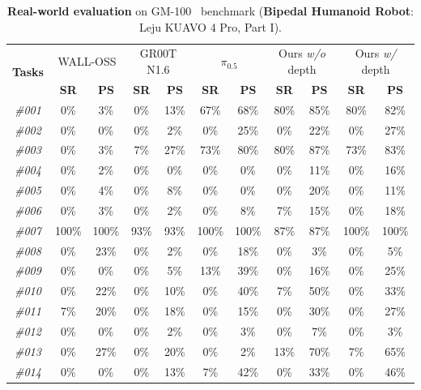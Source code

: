 \begin{table}[t]
  \centering
  \caption{\textbf{Real-world evaluation} on GM-100~\cite{gm100} benchmark (\textbf{Bipedal Humanoid Robot}: Leju KUAVO 4 Pro, Part I).}
  \small
  \setlength{\tabcolsep}{12pt}
    \begin{tabular}{ccccccccccc}
    \toprule
      \multirow{2}[2]{*}{\textbf{Tasks}} & \multicolumn{2}{c}{WALL-OSS} & \multicolumn{2}{c}{GR00T N1.6} &
  \multicolumn{2}{c}{$\pi_{0.5}$} & \multicolumn{2}{c}{Ours \textit{w/o} depth} & \multicolumn{2}{c}{Ours
  \textit{w/} depth} \\
            & \textbf{SR} & \textbf{PS} & \textbf{SR} & \textbf{PS} & \textbf{SR} & \textbf{PS} & \textbf{SR} &
  \textbf{PS} & \textbf{SR} & \textbf{PS} \\
    \midrule
      \textit{\#001} & 0\% & 3\% & 0\% & 13\% & 67\% & 68\% & 80\% & 85\% & 80\% & 82\% \\
      \textit{\#002} & 0\% & 0\% & 0\% & 2\% & 0\% & 25\% & 0\% & 22\% & 0\% & 27\% \\
      \textit{\#003} & 0\% & 3\% & 7\% & 27\% & 73\% & 80\% & 80\% & 87\% & 73\% & 83\% \\
      \textit{\#004} & 0\% & 2\% & 0\% & 0\% & 0\% & 0\% & 0\% & 11\% & 0\% & 16\% \\
      \textit{\#005} & 0\% & 4\% & 0\% & 8\% & 0\% & 0\% & 0\% & 20\% & 0\% & 11\% \\
      \textit{\#006} & 0\% & 3\% & 0\% & 2\% & 0\% & 8\% & 7\% & 15\% & 0\% & 18\% \\
      \textit{\#007} & 100\% & 100\% & 93\% & 93\% & 100\% & 100\% & 87\% & 87\% & 100\% & 100\% \\
      \textit{\#008} & 0\% & 23\% & 0\% & 2\% & 0\% & 18\% & 0\% & 3\% & 0\% & 5\% \\
      \textit{\#009} & 0\% & 0\% & 0\% & 5\% & 13\% & 39\% & 0\% & 16\% & 0\% & 25\% \\
      \textit{\#010} & 0\% & 22\% & 0\% & 10\% & 0\% & 40\% & 7\% & 50\% & 0\% & 33\% \\
      \textit{\#011} & 7\% & 20\% & 0\% & 18\% & 0\% & 15\% & 0\% & 30\% & 0\% & 27\% \\
      \textit{\#012} & 0\% & 0\% & 0\% & 2\% & 0\% & 3\% & 0\% & 7\% & 0\% & 3\% \\
      \textit{\#013} & 0\% & 27\% & 0\% & 20\% & 0\% & 2\% & 13\% & 70\% & 7\% & 65\% \\
      \textit{\#014} & 0\% & 0\% & 0\% & 13\% & 7\% & 42\% & 0\% & 33\% & 0\% & 46\% \\

\end{tabular}
\end{table}
